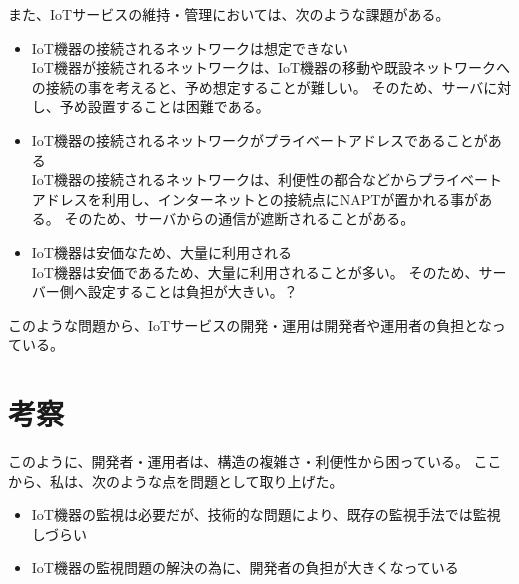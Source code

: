 また、IoTサービスの維持・管理においては、次のような課題がある。
\begin{itemize}
\item IoT機器の接続されるネットワークは想定できない\\
	IoT機器が接続されるネットワークは、IoT機器の移動や既設ネットワークへの接続の事を考えると、予め想定することが難しい。
	そのため、サーバに対し、予め設置することは困難である。
\item IoT機器の接続されるネットワークがプライベートアドレスであることがある\\
	IoT機器の接続されるネットワークは、利便性の都合などからプライベートアドレスを利用し、インターネットとの接続点にNAPTが置かれる事がある。
	そのため、サーバからの通信が遮断されることがある。
\item IoT機器は安価なため、大量に利用される\\
	IoT機器は安価であるため、大量に利用されることが多い。
	そのため、サーバー側へ設定することは負担が大きい。？
\end{itemize}
このような問題から、IoTサービスの開発・運用は開発者や運用者の負担となっている。



\section{考察}

このように、開発者・運用者は、構造の複雑さ・利便性から困っている。
ここから、私は、次のような点を問題として取り上げた。
\begin{itemize}
\item IoT機器の監視は必要だが、技術的な問題により、既存の監視手法では監視しづらい
\item IoT機器の監視問題の解決の為に、開発者の負担が大きくなっている
\end{itemize}


